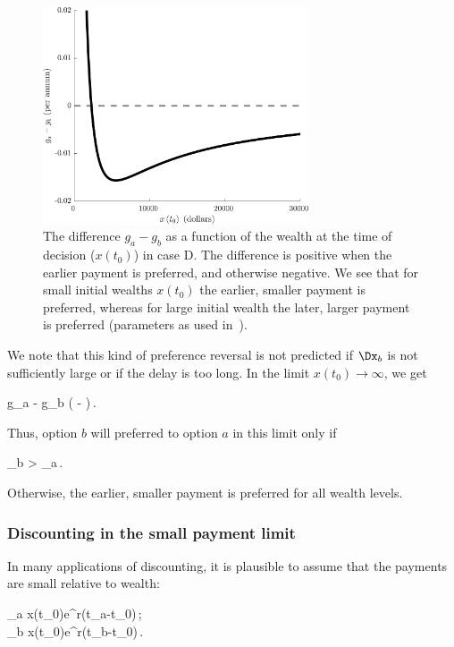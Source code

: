 \begin{figure}[!htb]
\centering
\includegraphics[width=0.7\textwidth]{./figures/caseD_ga_gb.jpg}
\caption{The difference $g_a-g_b$ as a function of the wealth at the time of decision ($x\left(t_0\right)$) in case D. The difference is positive when the earlier payment is preferred, and otherwise negative. We see that for small initial wealths $x\left(t_0\right)$ the earlier, smaller payment is preferred, whereas for large initial wealth the later, larger payment is preferred (parameters as used in~).}
\end{figure}

We note that this kind of preference reversal is not predicted if $\Dx_b$ is not sufficiently large or if the delay is too long. In the limit $x\left(t_0\right)\to \infty$, we get

\be
g_a - g_b \approx {} \left( - \right)\,.
\ee

Thus, option $b$ will preferred to option $a$ in this limit only if

\be
\Dx_b > \Dx_a\,.
\ee

Otherwise, the earlier, smaller payment is preferred for all wealth levels.

\subsubsection{Discounting in the small payment limit}

In many applications of discounting, it is plausible to assume that the payments are small relative to wealth:

\bea
\Dx_a \ll x\left(t_0\right)e^{r\left(t_a-t_0\right)}\,;\\
\Dx_b \ll x\left(t_0\right)e^{r\left(t_b-t_0\right)}\,.
\eea

